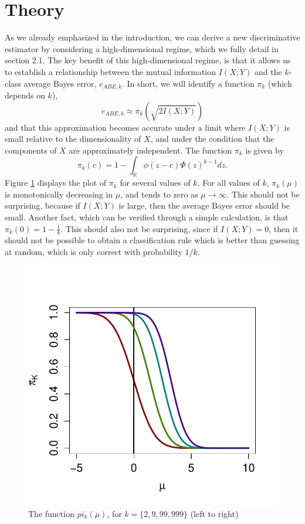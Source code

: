 \documentclass{article}
\begin{document}
\section{Theory}

As we already emphasized in the introduction, we can derive a new discriminative estimator 
by considering a high-dimensional regime, which we fully detail in section 2.1.
The key benefit of this high-dimensional regime, is that it allows us to establish a relationship between the
mutual information $I(X; Y)$ and the $k$-class average Bayes error,
$e_{ABE, k}$.  In short, we will identify a function $\pi_k$
(which depends on $k$),
\[
e_{ABE, k} \approx \pi_k(\sqrt{2 I(X; Y)})
\]
and that this approximation becomes accurate under a limit where $I(X; Y)$ is small relative to the dimensionality of $X$,
and under the condition that the components of $X$ are approximately independent.
The function $\pi_k$ is given by
\[
\pi_k(c) = 1 - \int_{\mathbb{R}} \phi(z - c)  \Phi(z)^{k-1} dz.
\]
Figure \ref{fig:pi} displays the plot of $\pi_k$ for several values of $k$.
For all values of $k$, $\pi_k(\mu)$ is monotonically decreasing in $\mu$, and tends to zero as $\mu \to \infty$.
This should not be surprising, because if $I(X; Y)$ is large, then the average Bayes error should be small.
Another fact, which can be verified through a simple calculation, is that 
$
\pi_k(0) = 1 - \frac{1}{k}.
$
This should also not be surprising, since if $I(X; Y) = 0$, then it should not be possible to
obtain a classification rule which is better than guessing at random, which is only correct with probability $1/k$.
\begin{figure}
\centering
\includegraphics[scale = 0.5, clip=true, trim=0 0.2in 0 0.5in]{../info_theory_sims/illus_piK.pdf}
\caption{The function $pi_k(\mu)$, for $k = \{2, 9, 99, 999\}$ (left to right) \label{fig:pi}}
\end{figure}
\end{document}
